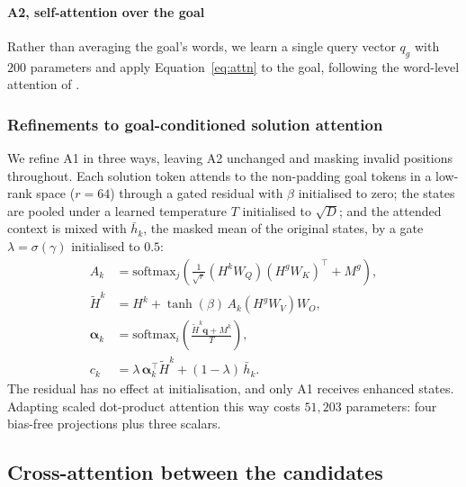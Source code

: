 \documentclass[11pt]{article}
\begin{document}
\paragraph{A2, self-attention over the goal}
Rather than averaging the goal's words, we learn a single query vector $q_g$
with $200$ parameters and apply Equation~\ref{eq:attn} to the goal, following
the word-level attention of \citet{yang2016hierarchical}.

\subsubsection{Refinements to goal-conditioned solution attention}
\label{sec:refine}

We refine A1 in three ways, leaving A2 unchanged and masking invalid positions
throughout. Each solution token attends to the non-padding goal tokens in a
low-rank space ($r = 64$) through a gated residual with $\beta$ initialised to
zero; the states are pooled under a learned temperature $T$ initialised to
$\sqrt{D}$; and the attended context is mixed with $\bar{h}_k$, the masked
mean of the original states, by a gate $\lambda = \sigma(\gamma)$ initialised
to $0.5$:
\begin{align}
A_k &= \mathrm{softmax}_j\!\left(
   \tfrac{1}{\sqrt{r}}\left(H^{k}W_{Q}\right)\left(H^{g}W_{K}\right)^{\!\top}
   \!+ M^{g}\right), \nonumber\\
\widetilde{H}^{k} &= H^{k} + \tanh(\beta)\,A_k\!\left(H^{g}W_{V}\right)W_{O},
   \nonumber\\
\boldsymbol{\alpha}_k &= \mathrm{softmax}_i\!\left(
   \tfrac{\widetilde{H}^{k}\mathbf{q} + M^{k}}{T}\right), \nonumber\\
c_k &= \lambda\,\boldsymbol{\alpha}_k^{\!\top}\widetilde{H}^{k}
       + (1-\lambda)\,\bar{h}_k .
\label{eq:refine}
\end{align}
The residual has no effect at initialisation, and only A1 receives enhanced
states. Adapting scaled dot-product attention \citep{vaswani2017attention}
this way costs $51{,}203$ parameters: four bias-free projections plus three
scalars.

\subsection{Cross-attention between the candidates}
\label{sec:cross}
\end{document}
